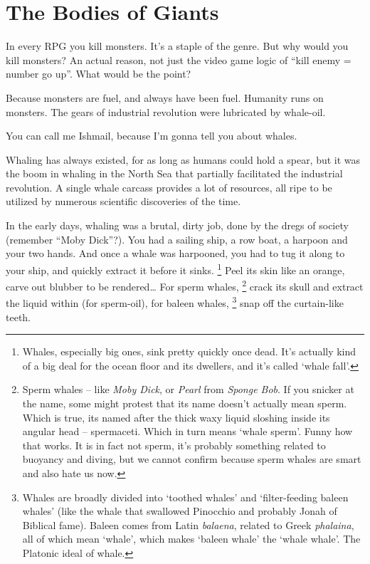 \section{The Bodies of Giants}

\begin{multicols}{2}

\noindent
In every RPG you kill monsters.
It's a staple of the genre.
But why would you kill monsters?
An actual reason, not just the video game logic of ``kill enemy = number go up''.
What would be the point?

Because monsters are fuel, and always have been fuel.
Humanity runs on monsters.
The gears of industrial revolution were lubricated by whale-oil.

You can call me Ishmail, because I'm gonna tell you about whales.

Whaling has always existed, for as long as humans could hold a spear, but it was the boom in whaling in the North Sea that partially facilitated the industrial revolution.
A single whale carcass provides a lot of resources, all ripe to be utilized by numerous scientific discoveries of the time.

In the early days, whaling was a brutal, dirty job, done by the dregs of society (remember ``Moby Dick''?).
You had a sailing ship, a row boat, a harpoon and your two hands.
And once a whale was harpooned, you had to tug it along to your ship, and quickly extract it before it sinks.%
\footnote{Whales, especially big ones, sink pretty quickly once dead.
It's actually kind of a big deal for the ocean floor and its dwellers, and it's called `whale fall'.}
Peel its skin like an orange, carve out blubber to be rendered\ldots
For sperm whales,%
\footnote{Sperm whales -- like \textit{Moby Dick}, or \textit{Pearl} from \textit{Sponge Bob}.
If you snicker at the name, some might protest that its name doesn't actually mean sperm.
Which is true, its named after the thick waxy liquid sloshing inside its angular head -- spermaceti.
Which in turn means `whale sperm'.
Funny how that works.
It is in fact not sperm, it's probably something related to buoyancy and diving, but we cannot confirm because sperm whales are smart and also hate us now.}
crack its skull and extract the liquid within (for sperm-oil), for baleen whales,%
\footnote{Whales are broadly divided into `toothed whales' and `filter-feeding baleen whales' (like the whale that swallowed Pinocchio and probably Jonah of Biblical fame).
Baleen comes from Latin \textit{balaena}, related to Greek \textit{phalaina}, all of which mean `whale', which makes `baleen whale' the `whale whale'.
The Platonic ideal of whale.}
snap off the curtain-like teeth.


\end{multicols}
